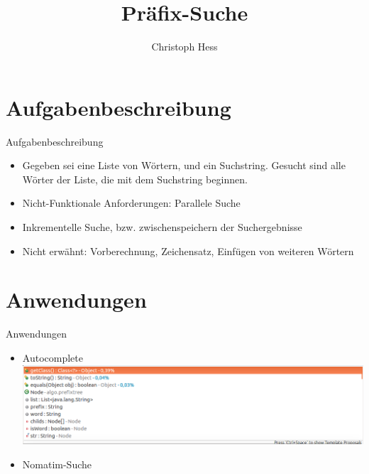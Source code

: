 \documentclass[11pt, xcolor=dvipsnames]{beamer}
\title{Präfix-Suche}
\author{Christoph Hess}
\begin{document}
	\maketitle
	
	\section{Aufgabenbeschreibung}
	\begin{frame}{Aufgabenbeschreibung}
		\begin{itemize}
			\item Gegeben sei eine Liste von Wörtern, und ein Suchstring. Gesucht sind alle Wörter der Liste, die mit dem Suchstring beginnen.
			
			\item Nicht-Funktionale Anforderungen: Parallele Suche
			\item Inkrementelle Suche, bzw. zwischenspeichern der Suchergebnisse
			\item Nicht erwähnt: Vorberechnung, Zeichensatz, Einfügen von weiteren Wörtern 
		\end{itemize}
	\end{frame}
	\section{Anwendungen}
	\begin{frame}{Anwendungen}
		\begin{itemize}
			\item Autocomplete
			\includegraphics[scale=0.3]{pics/autocomplete.png}
			\item Nomatim-Suche
			
		\end{itemize}
	\end{frame}
\end{document}
